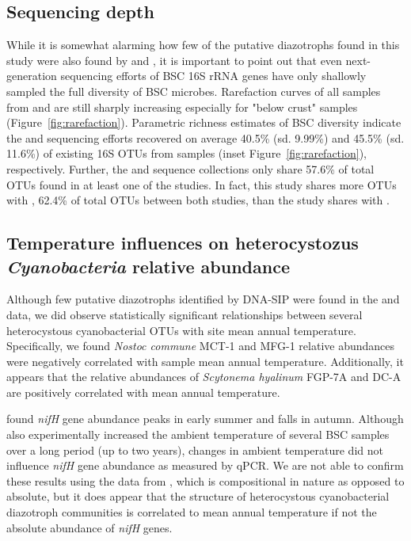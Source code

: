 {\subsection{Sequencing depth}
While it is somewhat alarming how few of the putative diazotrophs found in
this study were also found by \citet{Garcia_Pichel_2013} and
\citet{Steven_2013}, it is important to point out that even next-generation
sequencing efforts of BSC 16S rRNA genes have only shallowly sampled the full
diversity of BSC microbes.  Rarefaction curves of all samples from
\citet{Steven_2013} and \citet{Garcia_Pichel_2013} are still sharply
increasing especially for "below crust" samples
(Figure~\ref{fig:rarefaction}). Parametric richness estimates of BSC
diversity indicate the \citet{Steven_2013} and \citet{Garcia_Pichel_2013}
sequencing efforts recovered on average 40.5\% (sd. 9.99\%) and 45.5\% (sd.
11.6\%) of existing 16S OTUs from samples (inset
Figure~\ref{fig:rarefaction}), respectively. Further, the \citet{Steven_2013}
and \citet{Garcia_Pichel_2013} sequence collections only share 57.6\% of
total OTUs found in at least one of the studies. In fact, this study shares
more OTUs with \citet{Steven_2013}, 62.4\% of total OTUs between both
studies, than the \citet{Steven_2013} study shares with
\citet{Garcia_Pichel_2013}. 

\subsection{Temperature influences on heterocystozus \textit{Cyanobacteria}
relative abundance} Although few putative diazotrophs identified by DNA-SIP
were found in the \citet{Garcia_Pichel_2013} and \citet{Steven_2013} data, we
did observe statistically significant relationships between several
heterocystous cyanobacterial OTUs with site mean annual temperature.
Specifically, we found \textit{Nostoc commune} MCT-1 and MFG-1 relative
abundances were negatively correlated with sample mean annual temperature.
Additionally, it appears that the relative abundances of \textit{Scytonema
hyalinum} FGP-7A and DC-A are positively correlated with mean annual
temperature.

\citet{Yeager_2012} found \textit{nifH} gene abundance peaks in early summer
and falls in autumn. Although \citet{Yeager_2012} also experimentally
increased the ambient temperature of several BSC samples over a long period
(up to two years), changes in ambient temperature did not influence
\textit{nifH} gene abundance as measured by qPCR. We are not able to confirm
these results using the data from \citet{Garcia_Pichel_2013}, which is
compositional in nature as opposed to absolute, but it does appear that
the structure of heterocystous cyanobacterial diazotroph
communities is correlated to mean annual temperature if not the absolute
abundance of \textit{nifH} genes. 

}
